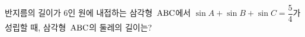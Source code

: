 반지름의 길이가 $6$인 원에 내접하는 삼각형~$\mathrm{ABC}$에서 $\sin A+\sin B+\sin C=\dfrac{5}{4}$가 성립할 때, 삼각형~$\mathrm{ABC}$의 둘레의 길이는?
